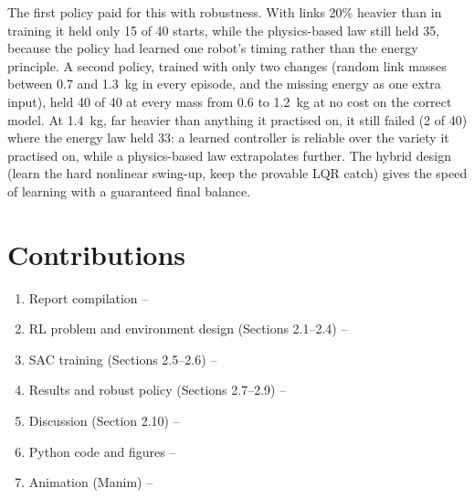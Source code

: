 \documentclass[12pt,a4paper]{article}
\begin{document}
The first policy paid for this with robustness. With links 20\% heavier than in training it held only 15 of 40 starts, while the physics-based law still held 35, because the policy had learned one robot's timing rather than the energy principle. A second policy, trained with only two changes (random link masses between 0.7 and 1.3~kg in every episode, and the missing energy as one extra input), held 40 of 40 at every mass from 0.6 to 1.2~kg at no cost on the correct model. At 1.4~kg, far heavier than anything it practised on, it still failed (2 of 40) where the energy law held 33: a learned controller is reliable over the variety it practised on, while a physics-based law extrapolates further. The hybrid design (learn the hard nonlinear swing-up, keep the provable LQR catch) gives the speed of learning with a guaranteed final balance.

\section{Contributions}
\begin{enumerate}
\item Report compilation -- \underline{\hspace{4cm}}
\item RL problem and environment design (Sections 2.1--2.4) -- \underline{\hspace{4cm}}
\item SAC training (Sections 2.5--2.6) -- \underline{\hspace{4cm}}
\item Results and robust policy (Sections 2.7--2.9) -- \underline{\hspace{4cm}}
\item Discussion (Section 2.10) -- \underline{\hspace{4cm}}
\item Python code and figures -- \underline{\hspace{4cm}}
\item Animation (Manim) -- \underline{\hspace{4cm}}
\end{enumerate}
\end{document}
